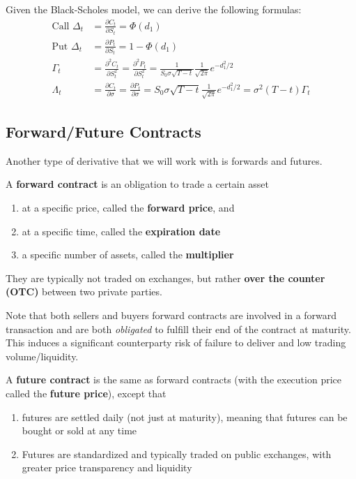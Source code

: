 \documentclass{article}
\begin{document}
\begin{theorem}
Given the Black-Scholes model, we can derive the following formulas: 
\begin{align*}
    \text{Call } \Delta_t & = \frac{\partial C_t}{\partial S_t} = \Phi(d_1) \\
    \text{Put } \Delta_t & = \frac{\partial P_t}{\partial S_t} = 1 - \Phi(d_1) \\
    \Gamma_t & = \frac{\partial^2 C_t}{\partial S_t^2} = \frac{\partial^2 P_t}{\partial S_t^2} = \frac{1}{S_0 \sigma \sqrt{T - t}} \frac{1}{\sqrt{2\pi}} e^{- d_1^2 / 2} \\
    \Lambda_t & = \frac{\partial C_t}{\partial \sigma} = \frac{\partial P_t}{\partial \sigma} = S_0 \sigma \sqrt{T - t} \frac{1}{\sqrt{2\pi}} e^{-d_1^2 / 2} = \sigma^2 (T - t) \Gamma_t 
\end{align*}
\end{theorem}

\subsection{Forward/Future Contracts}

Another type of derivative that we will work with is forwards and futures. 

\begin{definition}
A \textbf{forward contract} is an obligation to trade a certain asset 
\begin{enumerate}
    \item at a specific price, called the \textbf{forward price}, and 
    \item at a specific time, called the \textbf{expiration date} 
    \item a specific number of assets, called the \textbf{multiplier}
\end{enumerate}
They are typically not traded on exchanges, but rather \textbf{over the counter (OTC)} between two private parties. 
\end{definition}

Note that both sellers and buyers forward contracts are involved in a forward transaction and are both \textit{obligated} to fulfill their end of the contract at maturity. This induces a significant counterparty risk of failure to deliver and low trading volume/liquidity. 

\begin{definition}
A \textbf{future contract} is the same as forward contracts (with the execution price called the \textbf{future price}), except that 
\begin{enumerate}
    \item futures are settled daily (not just at maturity), meaning that futures can be bought or sold at any time 
    \item Futures are standardized and typically traded on public exchanges, with greater price transparency and liquidity
\end{enumerate}
\end{definition}
\end{document}
